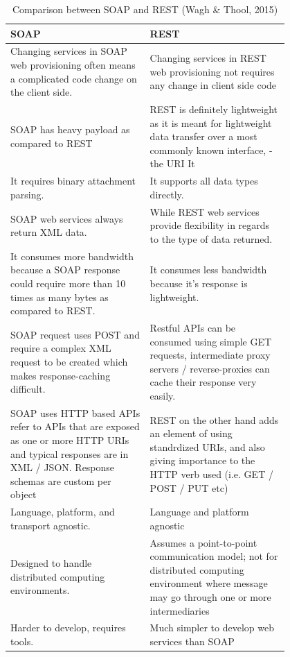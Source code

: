 \documentclass[conference]{IEEEtran}
\begin{document}
\begin{table}[!htbp]
	\centering
	\caption{Comparison between SOAP and REST (Wagh \& Thool, 2015)}
	\label{fig:compSoapRest}
	\begin{tabular}{| p{0.4\linewidth} | p{0.4\linewidth}|}\hline
		SOAP & REST \\\hline
		Changing services in SOAP web provisioning often means a complicated code change on the client side. & Changing services in REST web provisioning not requires any change in client side code\\\hline
		SOAP has heavy payload as compared to REST & REST is definitely lightweight as it is meant for lightweight data transfer over a most commonly known interface, - the URI
		It\\\hline
		It requires binary attachment parsing. & It supports all data types directly.\\\hline
		SOAP web services always return XML data. & While REST web services provide flexibility in regards to the type of data returned.\\\hline
		It consumes more bandwidth because a SOAP response could require more than 10 times as many bytes as compared to REST. & It consumes less bandwidth because it’s response is lightweight.\\\hline
		SOAP request uses POST and require a complex XML request to be created which makes response-caching difficult. & Restful APIs can be consumed using simple GET requests,
		intermediate proxy servers /
		reverse-proxies can cache their response very easily.\\\hline
		SOAP uses HTTP based APIs refer to APIs that are exposed as one or more HTTP URIs and typical responses are in XML / JSON. Response schemas are custom per object & REST on the other hand adds an element of using standrdized URIs, and also giving importance to the HTTP verb used (i.e. GET / POST / PUT etc)\\\hline
		Language, platform, and transport agnostic. & Language and platform agnostic\\\hline
		Designed to handle distributed computing environments. & Assumes a point-to-point communication model; not for distributed computing environment where message may go through one or more intermediaries\\\hline
		Harder to develop, requires tools. & Much simpler to develop web services than SOAP\\\hline

\end{tabular}
\end{table}
\end{document}
